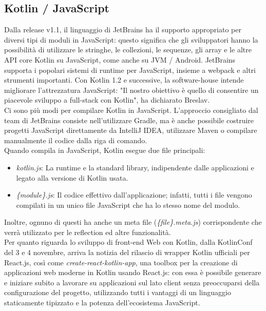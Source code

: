 \subsection{Kotlin / JavaScript}
Dalla release v1.1, il linguaggio di JetBrains ha il supporto appropriato per diversi tipi di moduli in JavaScript: questo significa che gli sviluppatori hanno la possibilità di utilizzare le stringhe, le collezioni, le sequenze, gli array e le altre API core Kotlin su JavaScript, come anche su JVM / Android. JetBrains supporta i popolari sistemi di runtime per JavaScript, insieme a webpack e altri strumenti importanti. Con Kotlin 1.2 e successive, la software-house intende migliorare l'attrezzatura JavaScript: "Il nostro obiettivo è quello di consentire un piacevole sviluppo a full-stack con Kotlin", ha dichiarato Breslav.\\
Ci sono più modi per compilare Kotlin in JavaScript. L'approccio consigliato dal team di JetBrains consiste nell'utilizzare Gradle, ma è anche possibile costruire progetti JavaScript direttamente da IntelliJ IDEA, utilizzare Maven o compilare manualmente il codice dalla riga di comando.\\
Quando compila in JavaScript, Kotlin esegue due file principali:
\begin{itemize}
  \item {\em kotlin.js}: La runtime e la standard library, indipendente dalle applicazioni e legato alla versione di Kotlin   usata.
  \item {\em \{module\}.js}: Il codice effettivo dall'applicazione; infatti, tutti i file vengono compilati in un unico file JavaScript che ha lo stesso nome del modulo.
\end{itemize}
Inoltre, ognuno di questi ha anche un meta file ({\em \{file\}.meta.js}) corrispondente che verrà utilizzato per le reflection ed altre funzionalità.\\
Per quanto riguarda lo sviluppo di front-end Web con Kotlin, dalla KotlinConf del 3 e 4 novembre, arriva la notizia del rilascio di wrapper Kotlin ufficiali per React.js, così come {\em create-react-kotlin-app}, una toolbox per la creazione di applicazioni web moderne in Kotlin usando React.js: con essa è possibile generare e iniziare subito a lavorare su applicazioni sul lato client senza preoccuparsi della configurazione del progetto, utilizzando tutti i vantaggi di un linguaggio staticamente tipizzato e la potenza dell'ecosistema JavaScript.\\

